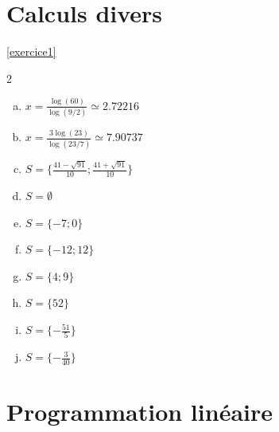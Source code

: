 \documentclass[twoside, a4paper, 12pt, openright, fullpage]{book}
\begin{document}
\section{Calculs divers}
\begin{solutions}{\ref{exercice1}}
\begin{multicols}{2}
\begin{enumerate}[a)]
\item $\displaystyle x=\frac{\log(60)}{\log(9/2)} \simeq 2.72216 $
\item
$\displaystyle x = \frac{3 \log(23)}{\log(23/7)} \simeq 7.90737$
\item
$\displaystyle S= \{\frac{41-\sqrt{91}}{10};\frac{41+\sqrt{91}}{10}\}$
\item
$S=\emptyset$
\item
$S=\{-7;0\}$
\item
$S=\{-12;12\}$
\item
$S=\{4;9\}$
\item 
$S=\{52\}$
\item 
$S=\{-\frac{51}{5}\}$
\item 
$S=\{-\frac{3}{40}\}$
\end{enumerate}
\end{multicols}
\end{solutions}

\section{Programmation linéaire}
\end{document}
